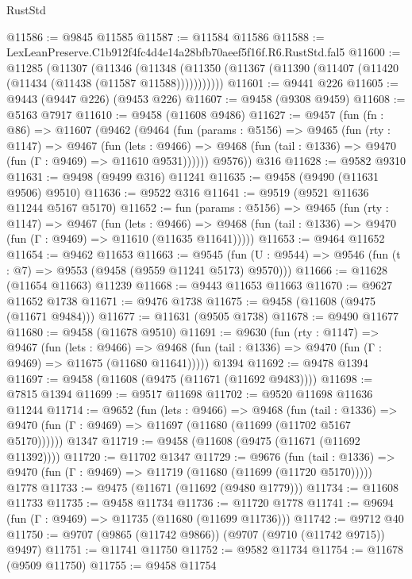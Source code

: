 \begin{lexlean}{RustStd}
\begin{coremodule}
@11586 := @9845 @11585
@11587 := @11584 @11586
@11588 := LexLeanPreserve.C1b912f4fc4d4e14a28bfb70aeef5f16f.R6.RustStd.fal5
@11600 := @11285
    (@11307
      (@11346
        (@11348 (@11350 (@11367 (@11390 (@11407 (@11420 (@11434 (@11438 (@11587 @11588)))))))))))
@11601 := @9441 @226
@11605 := @9443 (@9447 @226) (@9453 @226)
@11607 := @9458 (@9308 @9459)
@11608 := @5163 @7917
@11610 := @9458 (@11608 @9486)
@11627 := @9457
    (fun (fn : @86) =>
    @11607
      (@9462
        (@9464
          (fun (params : @5156) =>
          @9465
            (fun (rty : @1147) =>
            @9467
              (fun (lets : @9466) =>
              @9468 (fun (tail : @1336) => @9470 (fun (Γ : @9469) => @11610 @9531))))))
        @9576))
    @316
@11628 := @9582 @9310
@11631 := @9498 (@9499 @316) @11241
@11635 := @9458 (@9490 (@11631 @9506) @9510)
@11636 := @9522 @316
@11641 := @9519 (@9521 @11636 @11244 @5167 @5170)
@11652 := fun (params : @5156) =>
  @9465
    (fun (rty : @1147) =>
    @9467
      (fun (lets : @9466) =>
      @9468 (fun (tail : @1336) => @9470 (fun (Γ : @9469) => @11610 (@11635 @11641)))))
@11653 := @9464 @11652
@11654 := @9462 @11653
@11663 := @9545
    (fun (U : @9544) => @9546 (fun (t : @7) => @9553 (@9458 (@9559 @11241 @5173) @9570)))
@11666 := @11628 (@11654 @11663) @11239
@11668 := @9443 @11653 @11663
@11670 := @9627 @11652 @1738
@11671 := @9476 @1738
@11675 := @9458 (@11608 (@9475 (@11671 @9484)))
@11677 := @11631 (@9505 @1738)
@11678 := @9490 @11677
@11680 := @9458 (@11678 @9510)
@11691 := @9630
    (fun (rty : @1147) =>
    @9467
      (fun (lets : @9466) =>
      @9468 (fun (tail : @1336) => @9470 (fun (Γ : @9469) => @11675 (@11680 @11641)))))
    @1394
@11692 := @9478 @1394
@11697 := @9458 (@11608 (@9475 (@11671 (@11692 @9483))))
@11698 := @7815 @1394
@11699 := @9517 @11698
@11702 := @9520 @11698 @11636 @11244
@11714 := @9652
    (fun (lets : @9466) =>
    @9468
      (fun (tail : @1336) =>
      @9470 (fun (Γ : @9469) => @11697 (@11680 (@11699 (@11702 @5167 @5170))))))
    @1347
@11719 := @9458 (@11608 (@9475 (@11671 (@11692 @11392))))
@11720 := @11702 @1347
@11729 := @9676
    (fun (tail : @1336) => @9470 (fun (Γ : @9469) => @11719 (@11680 (@11699 (@11720 @5170)))))
    @1778
@11733 := @9475 (@11671 (@11692 (@9480 @1779)))
@11734 := @11608 @11733
@11735 := @9458 @11734
@11736 := @11720 @1778
@11741 := @9694 (fun (Γ : @9469) => @11735 (@11680 (@11699 @11736)))
@11742 := @9712 @40
@11750 := @9707 (@9865 (@11742 @9866)) (@9707 (@9710 (@11742 @9715)) @9497)
@11751 := @11741 @11750
@11752 := @9582 @11734
@11754 := @11678 (@9509 @11750)
@11755 := @9458 @11754

\end{coremodule}
\end{lexlean}
